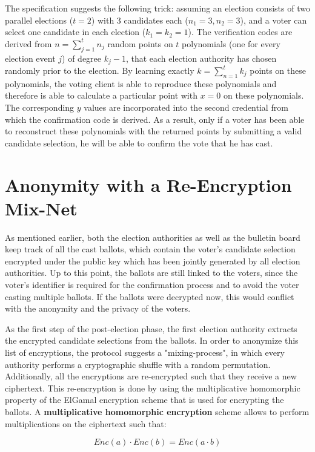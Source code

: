 The specification suggests the following trick: assuming an election consists of two parallel elections ($t=2$) with 3 candidates each ($n_1 = 3, n_2 = 3$), and a voter can select one candidate in each election ($k_1 = k_2 =1$). The verification codes are derived from $n = \sum_{j=1}^{t} n_j$ random points on $t$ polynomials (one for every election event $j$) of degree $k_j - 1$, that each election authority has chosen randomly prior to the election. By learning exactly $k = \sum_{n=1}^{t} k_j$ points on these polynomials, the voting client is able to reproduce these polynomials and therefore is able to calculate a particular point with $x=0$ on these polynomials. The corresponding $y$ values are incorporated into the second credential from which the confirmation code is derived. As a result, only if a voter has been able to reconstruct these polynomials with the returned points by submitting a valid candidate selection, he will be able to confirm the vote that he has cast.

\section{Anonymity with a Re-Encryption Mix-Net}
As mentioned earlier, both the election authorities as well as the bulletin board keep track of all the cast ballots, which contain the voter's candidate selection encrypted under the public key which has been jointly generated by all election authorities. Up to this point, the ballots are still linked to the voters, since the voter's identifier is required for the confirmation process and to avoid the voter casting multiple ballots. If the ballots were decrypted now, this would conflict with the anonymity and the privacy of the voters.

As the first step of the post-election phase, the first election authority extracts the encrypted candidate selections from the ballots. In order to anonymize this list of encryptions, the protocol suggests a "{}mixing-process"{}, in which every authority performs a cryptographic shuffle with a random permutation. Additionally, all the encryptions are re-encrypted such that they receive a new ciphertext. This re-encryption is done by using the multiplicative homomorphic property of the ElGamal encryption scheme that is used for encrypting the ballots. A \textbf{multiplicative homomorphic encryption} scheme allows to perform multiplications on the ciphertext such that:

\begin{equation*}Enc(a) \cdot Enc(b) = Enc(a \cdot b)\end{equation*}

